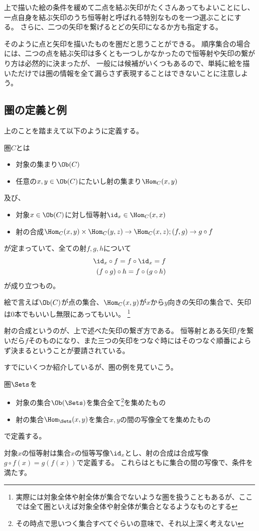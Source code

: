 \documentclass[uplatex]{jsarticle}
\begin{document}
上で描いた絵の条件を緩めて二点を結ぶ矢印がたくさんあってもよいことにし、
一点自身を結ぶ矢印のうち恒等射と呼ばれる特別なものを一つ選ぶことにする。
さらに、二つの矢印を繋げるとどの矢印になるか方も指定する。

そのように点と矢印を描いたものを圏だと思うことができる。
順序集合の場合には、二つの点を結ぶ矢印は多くとも一つしかなかったので恒等射や矢印の繋がり方は必然的に決まったが、
一般には候補がいくつもあるので、単純に絵を描いただけでは圏の情報を全て漏らさず表現することはできないことに注意しよう。

\subsection{圏の定義と例}
上のことを踏まえて以下のように定義する。
\begin{dfn}[圏]
圏$C$とは
\begin{itemize}
\item 対象の集まり$\Ob(C)$
\item 任意の$x, y\in \Ob(C)$にたいし射の集まり$\Hom_C(x,y)$
\end{itemize}
及び、
\begin{itemize}
\item 対象$x\in \Ob(C)$に対し恒等射$\id_x\in\Hom_C(x,x)$
\item 射の合成$\Hom_C(x,y)\times\Hom_C(y,z)\to \Hom_C(x,z); (f,g)\to g\circ f$
\end{itemize}
が定まっていて、全ての射$f, g, h$について
\begin{align*}
\id_x\circ f=f\circ \id_x=f\\
(f\circ g)\circ h=f\circ(g\circ h)
\end{align*}
が成り立つもの。
\end{dfn}
絵で言えば$\Ob(C)$が点の集合、$\Hom_C(x,y)$が$x$から$y$向きの矢印の集合で、矢印は$0$本でもいいし無限にあってもいい。
\footnote{実際には対象全体や射全体が集合でないような圏を扱うこともあるが、ここでは全て圏といえば対象全体や射全体が集合となるようなものとする} 

射の合成というのが、上で述べた矢印の繋ぎ方である。
恒等射とある矢印$f$を繋いだら$f$そのものになり、また三つの矢印をつなぐ時にはそのつなぐ順番によらず決まるということが要請されている。

すでにいくつか紹介しているが、圏の例を見ていこう。

\begin{eg}
圏$\Sets$を
\begin{itemize}
\item 対象の集合$\Ob(\Sets)$を集合全て\footnote{その時点で思いつく集合すべてぐらいの意味で、それ以上深く考えない}を集めたもの
\item 射の集合$\Hom_{\Sets}(x,y)$を集合$x,y$の間の写像全てを集めたもの
\end{itemize}
で定義する。

対象$x$の恒等射は集合$x$の恒等写像$\id_x$とし、射の合成は合成写像$g\circ f(x) = g(f(x))$で定義する。
これらはともに集合の間の写像で、条件を満たす。
\end{eg}
\end{document}
